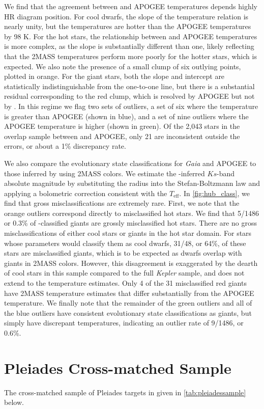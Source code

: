 \documentclass[preprint2]{aastex62}
\newcommand{\Kepler}{\mbox{\textit{Kepler}}}
\newcommand{\Gaia}{\mbox{\textit{Gaia}}}
\newcommand{\Teff}{\ensuremath{T_{\textrm{eff}}}}
\newcommand{\Ks}{\ensuremath{Ks}}
\begin{document}
We find that the agreement between \citet{Huber14} and APOGEE temperatures 
depends highly HR diagram position. For cool dwarfs, the slope of the 
temperature
relation is nearly unity, but the \citet{Huber14} temperatures are hotter than
the APOGEE temperatures by 98 K. For the hot stars, the 
relationship between \citet{Huber14} and APOGEE temperatures is more complex, as the slope is
substantially different than one, likely reflecting that the 2MASS temperatures
perform more poorly for the hotter stars, which is expected. We also note the 
presence of a small clump of 
six outlying points, plotted in orange. For the giant stars, 
both the slope and intercept are statistically indistinguishable from the 
one-to-one line, but there is a substantial residual corresponding to the red 
clump, which is resolved by APOGEE but not by \citet{Huber14}. In this regime
we flag two sets of outliers, a set 
of six where the \citet{Huber14} temperature is greater than APOGEE (shown in
blue), and a set of nine outliers where the APOGEE temperature is higher
(shown in green). Of the 2,043 stars in the overlap sample between 
\citet{Huber14} and APOGEE, only 21 are inconsistent outside the errors, or 
about a 1\% discrepancy rate.

We also compare the evolutionary state classifications for \Gaia{} and APOGEE
to those inferred by \citet{Huber14} using 2MASS colors. We estimate the
\citet{Huber14}-inferred \Ks-band absolute magnitude by substituting the
\citet{Huber14} radius into the Stefan-Boltzmann law and applying a bolometric
correction consistent with the \citet{Huber14} \Teff. In \cref{fig:hub_class},
we find that gross misclassifications are extremely rare.  First, we note 
that the orange outliers correspond directly to misclassified hot stars. We 
find that 5/1486 or 0.3\% of 
\citet{Huber14}-classified giants are grossly misclassified hot stars. There 
are no gross misclassifications of either cool stars or giants in the hot star 
domain. For stars whose \citet{Huber14} parameters would classify them as cool
dwarfs, 31/48, or 64\%, of these stars are misclassified giants, which is to be
expected as dwarfs overlap with giants in 2MASS colors.
However, this disagreement is exaggerated by the dearth of cool stars in this
sample compared to the full \Kepler{} sample, and does not extend to the 
temperature estimates. Only 4 of the 31 misclassified red giants
have 2MASS temperature estimates that differ substantially from the APOGEE
temperature. We finally note that the remainder of the
green outliers and all of the blue outliers have consistent evolutionary state
classifications as giants, but simply have discrepant temperatures, indicating
an outlier rate of 9/1486, or 0.6\%.

\section{Pleiades Cross-matched Sample}

The cross-matched sample of Pleiades targets in given in \cref{tab:pleiadessample} below.

\movetabledown=3in
\begin{rotatetable*}

\end{rotatetable*}
\end{document}
